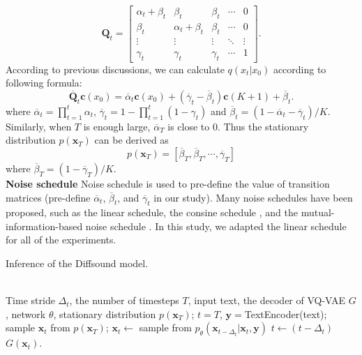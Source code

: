 \documentclass[lettersize,journal]{IEEEtran}
\begin{document}
\begin{equation} \label{masked and uniform transition mat}
 \boldsymbol{Q}_t =
 \begin{bmatrix}
    \alpha_t + \beta_t  & \beta_t & \beta_t & \cdots & 0 \\
    \beta_t &  \alpha_t + \beta_t & \beta_t  & \cdots & 0  \\
\vdots  &   \vdots     &  \vdots      &  \ddots  &    \vdots \\
    \gamma_t & \gamma_t & \gamma_t   &  \cdots & 1
\end{bmatrix}.
\end{equation}
According to previous discussions, we can calculate $q(x_t|x_0)$ according to following formula:
\begin{equation}\label{formula:quick cal uniform and mask matrix}
   \overline{\boldsymbol{Q}}_t \boldsymbol{c}(x_0) = \overline{\alpha}_t \boldsymbol{c}(x_0) + ( \overline{\gamma}_t - \overline{\beta}_t )\boldsymbol{c}(K+1) + \overline{\beta}_t .
\end{equation} 
where $\overline{\alpha}_t= \prod_{t=1}^{t} \alpha_t$, $\overline{\gamma}_t=1-\prod_{t=1}^{t}(1-\gamma_t)$ and $\overline{\beta}_t=(1-\overline{\alpha}_t - \overline{\gamma}_t)/K$.
Similarly, when $T$ is enough large, $\overline{\alpha}_T$ is close to 0. Thus the stationary distribution $p(\boldsymbol{x}_T)$ can be derived as
\begin{equation}\label{formula:masked transition matrices}
  p(\boldsymbol{x}_T)=[\overline{\beta}_T, \overline{\beta}_T , \cdots, \overline{\gamma}_T]
\end{equation}
where $\overline{\beta}_T=(1-\overline{\gamma}_T)/K$. \\
\textbf{Noise schedule} Noise schedule is used to pre-define the value of transition matrices (pre-define $\overline{\alpha}_t$, $\overline{\beta}_t$, and $\overline{\gamma}_t$ in our study). Many noise schedules have been proposed, such as the linear schedule, the consine schedule \cite{nichol2021improved}, and the mutual-information-based noise schedule \cite{austin2021structured}. In this study, we adapted the linear schedule for all of the experiments. \\
\begin{algorithm}[t]
\caption{Inference of the Diffsound model.}
\label{alg:PA2}
\begin{algorithmic}[1]
\REQUIRE ~~\\
    Time stride $\Delta_t$, the number of timesteps $T$, input text, the decoder of VQ-VAE $G$, network $\theta$, stationary distribution $p(\boldsymbol{x}_T)$;
    \STATE $t=T$, $\boldsymbol{y}=$TextEncoder(text);
    \STATE sample $\boldsymbol{x}_t$ from $p(\boldsymbol{x}_T)$;
    \STATE $\boldsymbol{x}_t \leftarrow $ sample from $p_{\theta}(\boldsymbol{x}_{t-\Delta_t}|\boldsymbol{x}_t,\boldsymbol{y})$
    \STATE $t \leftarrow (t-\Delta_t)$
    \ENDWHILE
\RETURN  $G(\boldsymbol{x}_t)$.
\end{algorithmic}
\end{algorithm}
\end{document}
